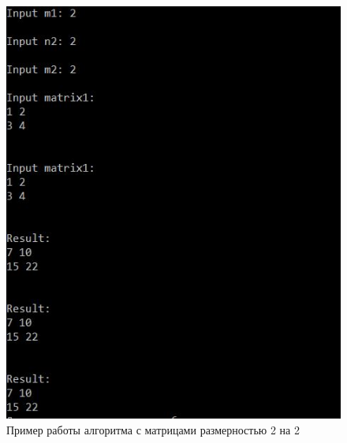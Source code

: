 \documentclass[12pt]{report}
\begin{document}
\begin{figure}[h]
\centering
\includegraphics[width=1\linewidth]{matrix22.jpg}
\caption{Пример работы алгоритма с матрицами размерностью 2 на 2}
\label{fig:mpr}
\end{figure}
\end{document}
